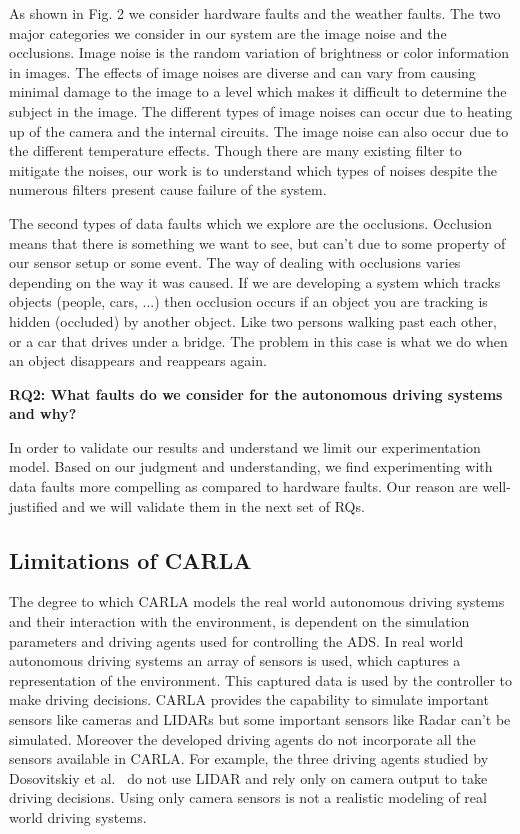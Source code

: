As shown in Fig. 2 we consider hardware faults and the weather faults. The two major categories we consider in our system are the image noise and the occlusions. Image noise is the random variation of brightness or color information in images.
The effects of image noises are diverse and can vary from causing minimal damage to the image to
a level which makes it difficult to determine the subject in the image. The different types of image noises can occur due to heating up of the camera and the internal circuits. The image noise can also occur due to the different temperature effects. Though there are many existing filter to mitigate the noises, our work is to understand which types of noises despite the numerous filters present cause failure of the system. 

The second types of data faults which we explore are the occlusions. Occlusion means that there is something we want to see, but can't due to some property of our sensor setup or some event. The way of dealing with occlusions varies depending on the way it was caused. If we are developing a system which tracks objects (people, cars, ...) then occlusion occurs if an object you are tracking is hidden (occluded) by another object. Like two persons walking past each other, or a car that drives under a bridge. The problem in this case is what we do when an object disappears and reappears again.

\textbf{RQ2: What faults do we consider for the autonomous driving systems and why?}

In order to validate our results and understand we limit our experimentation model. Based on our judgment and understanding, we find experimenting with data faults more compelling as compared to hardware faults. Our reason are well-justified and we will validate them in the next set of RQs.

\subsection{Limitations of CARLA}
The degree to which CARLA models the real world autonomous driving systems and their interaction with the environment, is dependent on the simulation parameters and driving agents used for controlling the ADS. In real world autonomous driving systems an array of sensors is used, which captures a representation of the environment. This captured data is used by the controller to make driving decisions. CARLA provides the capability to simulate important sensors like cameras and LIDARs but some important sensors like Radar can't be simulated. Moreover the developed driving agents do not incorporate all the sensors available in CARLA. For example, the three driving agents studied by Dosovitskiy et al.~\cite{Dosovitskiy17} do not use LIDAR and rely only on camera output to take driving decisions. Using only camera sensors is not a realistic modeling of real world driving systems. 


